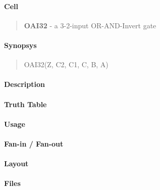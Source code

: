 \label{OAI32}
\paragraph{Cell}
\begin{quote}
    \textbf{OAI32} - a 3-2-input OR-AND-Invert gate
\end{quote}

\paragraph{Synopsys}
\begin{quote}
    OAI32(Z, C2, C1, C, B, A)
\end{quote}

\paragraph{Description}

%

\paragraph{Truth Table}
%

\paragraph{Usage}

\paragraph{Fan-in / Fan-out}

\paragraph{Layout}

\paragraph{Files}
